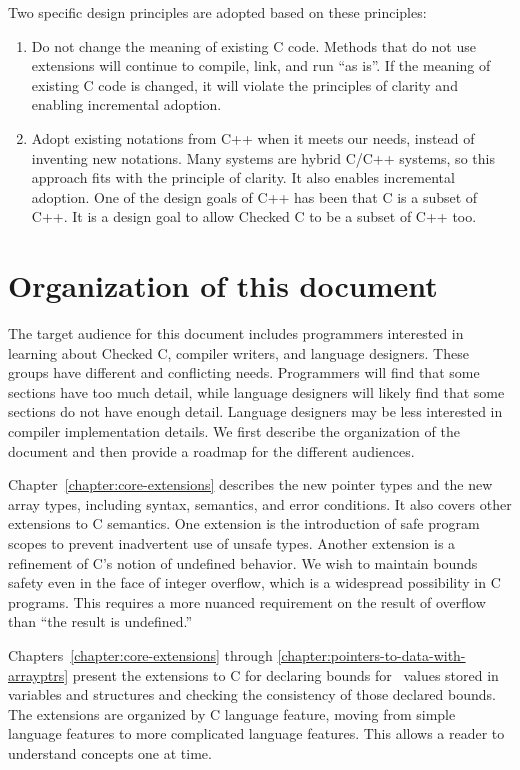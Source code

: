 Two specific design principles are adopted based on these principles:

\begin{enumerate}
\item
  Do not change the meaning of existing C code. Methods that do not use
  extensions will continue to compile, link, and run ``as is''. If the
  meaning of existing C code is changed, it will violate the principles
  of clarity and enabling incremental adoption.
\item
  Adopt existing notations from C++ when it meets our needs, instead of
  inventing new notations. Many systems are hybrid C/C++ systems, so
  this approach fits with the principle of clarity. It also enables
  incremental adoption. One of the design goals of C++ has been that C
  is a subset of C++.  It is a design goal to allow Checked C to be a 
  subset of C++ too.
\end{enumerate}

\section{Organization of this document}

The target audience for this document includes programmers interested in 
learning about Checked C, compiler writers, and language designers.
These groups have different and conflicting needs.  Programmers will find that
some sections have too much detail, while language designers will likely
find that some sections do not have enough detail.  Language designers
may be less interested in compiler implementation details.
We first describe the organization of the document and then provide
a roadmap for the different audiences.

Chapter~\ref{chapter:core-extensions} describes
the new pointer types and the new array types, including syntax,
semantics, and error conditions. It also covers other extensions to C
semantics. One extension is the introduction of safe program scopes to
prevent inadvertent use of unsafe types. Another extension is a
refinement of C's notion of undefined behavior. We wish to maintain
bounds safety even in the face of integer overflow, which is a
widespread possibility in C programs. This requires a more nuanced
requirement on the result of overflow than ``the result is undefined.''

Chapters~\ref{chapter:core-extensions} through 
\ref{chapter:pointers-to-data-with-arrayptrs}
present the extensions to C for declaring bounds
for \arrayptr\ values stored in variables and structures and
checking the consistency of those declared bounds. The extensions are
organized by C language feature, moving from simple language features to
more complicated language features. This allows a reader to understand
concepts one at time.

